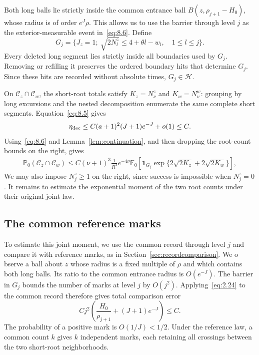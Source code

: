 \documentclass[11pt,letterpaper,reqno]{amsart}
\newif\ifrevmarks \revmarkstrue
\newif\ifshowdeleted \showdeletedfalse
\newcommand{\add}[1]{\ifrevmarks\textcolor{revorange}{#1}\else#1\fi}
\newcommand{\del}[1]{\ifrevmarks\ifshowdeleted{\color{revorange}\footnotesize[\textit{deleted:}~#1]}%
  \else\mbox{\textsuperscript{\textcolor{revorange}{\normalfont\bfseries[del]}}}\fi\fi}
\numberwithin{equation}{section}
\theoremstyle{remark}
\begin{document}
Both long balls lie strictly inside the common entrance ball $B(z,\rho_{j+1}-H_0)$, whose radius is of order $e^J\rho$. This allows us to use the barrier through level $j$ as the exterior-measurable event in~\eqref{eq:8.6}. Define
\begin{equation}\label{eq:8.9}
G_j=\{J_z=1;\ \sqrt{2N_l^z}\le4+\theta l-w_l,\quad1\le l\le j\}.
\end{equation}
Every deleted long segment lies strictly inside all boundaries used by $G_j$. Removing or refilling it preserves the ordered boundary hits that determine $G_j$. Since these hits are recorded without absolute times, $G_j\in\mathscr H$.

On $\mathcal C_z\cap\mathcal C_w$, the short-root totals satisfy
$K_z=N_\nu^z$ and $K_w=N_\nu^w$: grouping by long excursions and the nested decomposition enumerate the same complete short segments. Equation~\eqref{eq:8.5} gives
\begin{equation}\label{eq:8.10}
\eta_{\rm dec}\le C(a+1)^2(J+1)e^{-J}+o(1)\le C.
\end{equation}
Using~\eqref{eq:8.6} and Lemma~\ref{lem:continuation}, and then dropping the root-count bounds on the right, gives
\begin{equation}\label{eq:8.11}
\begin{split}
\mathbb P_0(\mathcal C_z\cap\mathcal C_w)
\le C(\nu+1)^3\frac{1}{R^4}e^{-4\nu}
\mathbb E_0[\mathbf1_{G_j}\exp\{2\sqrt{2K_z}+2\sqrt{2K_w}\}],
\end{split}
\end{equation}
We may also impose $N_j^z\ge1$ on the right, since success is impossible when $N_j^z=0$. It remains to estimate the exponential moment of the two root counts under their original joint law.

\subsection{The common reference marks}\label{sec:commonmarks}
To estimate this joint moment, \add{we} use the common record through level $j$\add{ and compare it with reference marks, as in Section~\ref{sec:recordcomparison}}. \add{We o}\del{O}bserve a ball about $z$ whose radius is a fixed multiple of $\rho$ and which contains both long balls. Its ratio to the common entrance radius is $O(e^{-J})$. The barrier in $G_j$ bounds the number of marks at level $j$ by $O(j^2)$. Applying~\eqref{eq:2.24} to the common record therefore gives total comparison error
\begin{equation}\label{eq:8.12}
Cj^2\left(\frac{H_0}{\rho_{j+1}}+(J+1)e^{-J}\right)\le C.
\end{equation}
The probability of a positive mark is $O(1/J)<1/2$. Under the reference law, a common count $k$ gives $k$ independent marks, each retaining all crossings between the two short-root neighborhoods.
\end{document}

